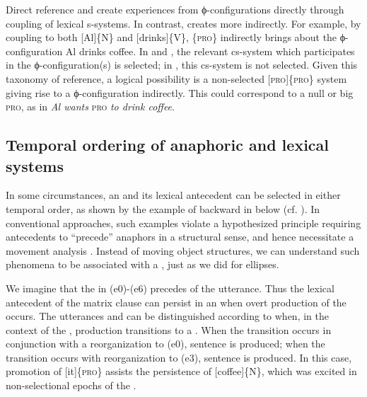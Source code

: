 Direct reference and  create  experiences from ϕ-con\-fig\-u\-ra\-tions directly through coupling of lexical s-systems. In contrast,  creates  more indirectly. For example, by coupling to both [Al]\{N\} and [drinks]\{V\}, \{\textsc{pro}\} indirectly brings about the ϕ-con\-fig\-u\-ra\-tion {\textbar}Al drinks coffee{\textbar}. In  and , the relevant cs-system which participates in the ϕ-con\-fig\-u\-ra\-tion(s) is selected; in , this cs-system is not selected. Given this taxonomy of reference, a logical possibility is a non-selected [\textsc{pro}]\{\textsc{pro}\} system giving rise to a ϕ-con\-fig\-u\-ra\-tion indirectly. This could correspond to a null  or big \textsc{pro}, as in \textit{Al wants} \textsc{pro} \textit{to drink coffee}.

\subsection{Temporal ordering of anaphoric and lexical systems}

In some circumstances, an  and its lexical antecedent can be selected in either temporal order, as shown by the example of backward  in  below (cf. \citealt{KazaninaEtAl2007,ReulandAvrutin2005}). In conventional approaches, such examples violate a hypothesized principle requiring antecedents to “precede” anaphors in a structural sense, and hence necessitate a movement analysis \citep{Chomsky1993}. Instead of moving object structures, we can understand such phenomena to be associated with a , just as we did for ellipses.

  We imagine that the  in {} (e0)-(e6) precedes  of the utterance. Thus the lexical antecedent of the matrix clause can persist in an  when overt production of the  occurs. The utterances  and  can be distinguished according to when, in the context of the , production transitions to a . When the transition occurs in conjunction with a reorganization to (e0), sentence  is produced; when the transition occurs with reorganization to (e3), sentence  is produced. In this case, promotion of [it]\{\textsc{pro}\} assists the persistence of [coffee]\{N\}, which was excited in non-selectional epochs of the .

